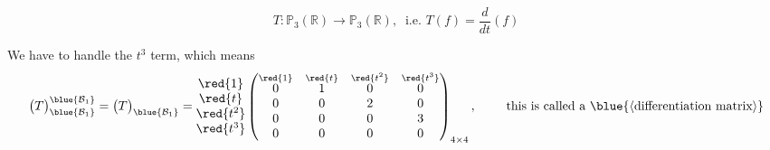 \begin{eg}
    \[
        T: \mathbb{P}_3(\mathbb{R}) \to \mathbb{P}_3(\mathbb{R}), \ \text{ i.e. } T(f) = \frac{d}{dt} (f)
    \]
\end{eg}
We have to handle the $t^3$ term, which means
\[
    \begin{pmatrix}
        T
    \end{pmatrix}_{\blue{\mathcal{B}_1}}^{\blue{\mathcal{B}_1}} = \begin{pmatrix}
        T
    \end{pmatrix}_{\blue{\mathcal{B}_1}} = \begin{matrix} 
        \red{1} \\ \red{t} \\ \red{t^2} \\ \red{t^3}
    \end{matrix}
    \begin{pmatrix}
        \overset{\red{1}}{0} & \overset{\red{t}}{1} & \overset{\red{t^2}}{0} & \overset{\red{t^3}}{0} \\
        0 & 0 & 2 & 0 \\
        0 & 0 & 0 & 3 \\
        0 & 0 & 0 & 0
    \end{pmatrix}_{4 \times 4}, \quad \quad \text{ this is called a } \blue{\langle \text{differentiation matrix} \rangle}
\]

\newpage


